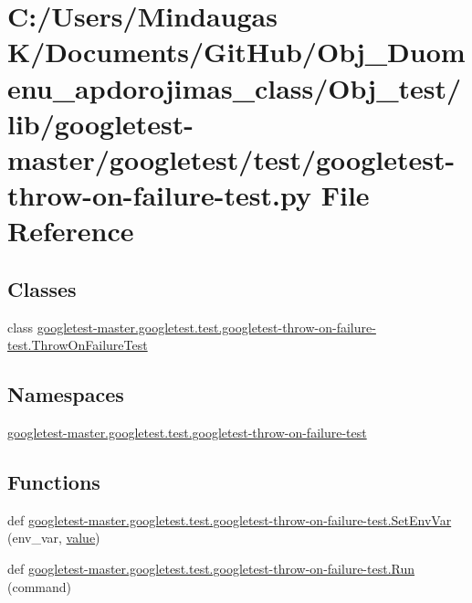 \hypertarget{_obj__test_2lib_2googletest-master_2googletest_2test_2googletest-throw-on-failure-test_8py}{}\section{C\+:/\+Users/\+Mindaugas K/\+Documents/\+Git\+Hub/\+Obj\+\_\+\+Duomenu\+\_\+apdorojimas\+\_\+class/\+Obj\+\_\+test/lib/googletest-\/master/googletest/test/googletest-\/throw-\/on-\/failure-\/test.py File Reference}
\label{_obj__test_2lib_2googletest-master_2googletest_2test_2googletest-throw-on-failure-test_8py}
\subsection*{Classes}
\begin{DoxyCompactItemize}
\item 
class \mbox{\hyperlink{classgoogletest-master_1_1googletest_1_1test_1_1googletest-throw-on-failure-test_1_1_throw_on_failure_test}{googletest-\/master.\+googletest.\+test.\+googletest-\/throw-\/on-\/failure-\/test.\+Throw\+On\+Failure\+Test}}
\end{DoxyCompactItemize}
\subsection*{Namespaces}
\begin{DoxyCompactItemize}
\item 
 \mbox{\hyperlink{namespacegoogletest-master_1_1googletest_1_1test_1_1googletest-throw-on-failure-test}{googletest-\/master.\+googletest.\+test.\+googletest-\/throw-\/on-\/failure-\/test}}
\end{DoxyCompactItemize}
\subsection*{Functions}
\begin{DoxyCompactItemize}
\item 
def \mbox{\hyperlink{namespacegoogletest-master_1_1googletest_1_1test_1_1googletest-throw-on-failure-test_a174db536dfcbe634815eb300090c6aaf}{googletest-\/master.\+googletest.\+test.\+googletest-\/throw-\/on-\/failure-\/test.\+Set\+Env\+Var}} (env\+\_\+var, \mbox{\hyperlink{_obj__test_2lib_2googletest-master_2googlemock_2test_2gmock-matchers__test_8cc_a337b8a670efc0b086ad3af163f3121b6}{value}})
\item 
def \mbox{\hyperlink{namespacegoogletest-master_1_1googletest_1_1test_1_1googletest-throw-on-failure-test_a347d782db7f176742e810f0284c32753}{googletest-\/master.\+googletest.\+test.\+googletest-\/throw-\/on-\/failure-\/test.\+Run}} (command)
\end{DoxyCompactItemize}
